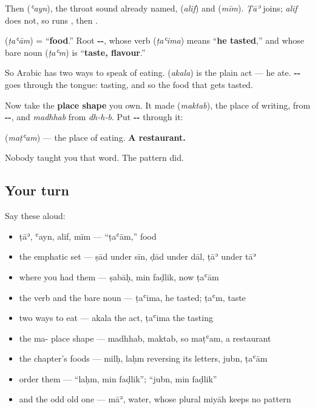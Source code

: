 Then \textbf{} (\emph{ʿayn}), the throat sound already named, \textbf{} (\emph{alif}) and \textbf{} (\emph{mīm}). \emph{Ṭāʾ} joins; \emph{alif} does not, so \textbf{} runs \textbf{}, then \textbf{}.

\begin{cousinweb}
\textbf{} (\emph{ṭaʿām}) = \textquotedblleft{}\textbf{food}.\textquotedblright{} Root \textbf{--}, whose verb \textbf{} (\emph{ṭaʿima}) means \textquotedblleft{}\textbf{he tasted},\textquotedblright{} and whose bare noun \textbf{} (\emph{ṭaʿm}) is \textquotedblleft{}\textbf{taste, flavour}.\textquotedblright{}

So Arabic has two ways to speak of eating. \textbf{} (\emph{akala}) is the plain act — he ate. \textbf{--} goes through the tongue: tasting, and so the food that gets tasted.

Now take the \textbf{ place shape} you own. It made \textbf{} (\emph{maktab}), the place of writing, from \textbf{--}, and \emph{madhhab} from \emph{dh-h-b}. Put \textbf{--} through it:

\textbf{} (\emph{maṭʿam}) — the place of eating. \textbf{A restaurant.}

Nobody taught you that word. The pattern did.
\end{cousinweb}

\subsection*{Your turn}
Say these aloud:

\begin{itemize}
\raggedright
  \item ṭāʾ, ʿayn, alif, mīm — \textquotedblleft{}ṭaʿām,\textquotedblright{} food
  \item the emphatic set — ṣād under sīn, ḍād under dāl, ṭāʾ under tāʾ
  \item where you had them — ṣabāḥ, min faḍlik, now ṭaʿām
  \item the verb and the bare noun — ṭaʿima, he tasted; ṭaʿm, taste
  \item two ways to eat — akala the act, ṭaʿima the tasting
  \item the ma- place shape — madhhab, maktab, so maṭʿam, a restaurant
  \item the chapter's foods — milḥ, laḥm reversing its letters, jubn, ṭaʿām
  \item order them — \textquotedblleft{}laḥm, min faḍlik\textquotedblright{}; \textquotedblleft{}jubn, min faḍlik\textquotedblright{}
  \item and the odd old one — māʾ, water, whose plural miyāh keeps no pattern
\end{itemize}

